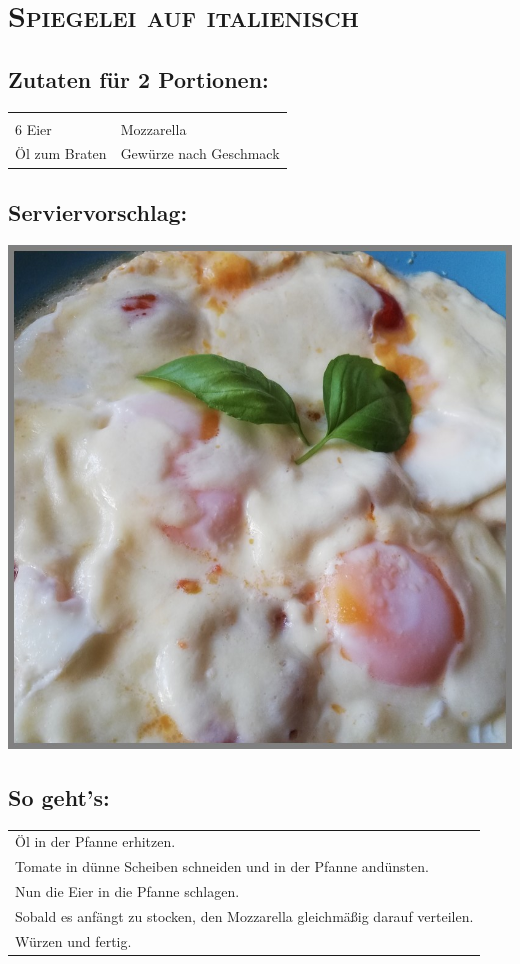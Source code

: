 \section{\textsc{Spiegelei auf italienisch}}

\subsection*{Zutaten für 2 Portionen:}

\begin{tabular}{p{7.5cm} p{7.5cm}}
	& \\
	6 Eier & Mozzarella \\
	Öl zum Braten & Gewürze nach Geschmack
\end{tabular}

\subsection*{Serviervorschlag:}

\includegraphics[width=\textwidth]{img/spiegelei.jpg} \cite{itaspiegelei}

\subsection*{So geht's:}

\begin{tabular}{p{15cm}}
	\\
  Öl in der Pfanne erhitzen.\\
  Tomate in dünne Scheiben schneiden und in der Pfanne andünsten.\\
  Nun die Eier in die Pfanne schlagen.\\
  Sobald es anfängt zu stocken, den Mozzarella gleichmäßig darauf verteilen.\\
  Würzen und fertig.
\end{tabular}
